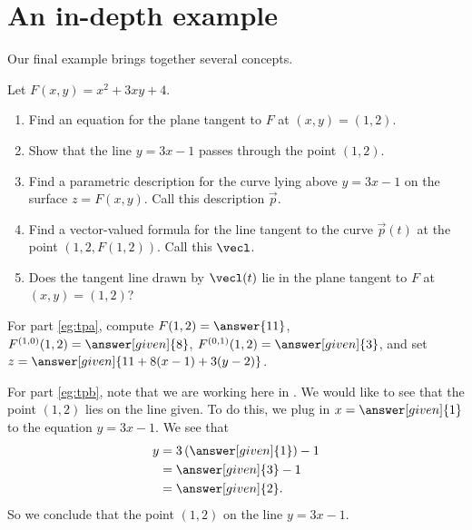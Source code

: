 \documentclass{ximera}
\begin{document}
\section{An in-depth example}

Our final example brings together several concepts.
\begin{example}
  Let $F(x,y) = x^2 + 3xy + 4$.
  \begin{enumerate}
  \item\label{eg:tpa} Find an equation for the plane tangent to $F$ at $(x,y) =
    (1,2)$.
  \item\label{eg:tpb} Show that the line $y = 3x - 1$ passes through the point $(1,2)$.
  \item\label{eg:tpc} Find a parametric description for the curve
    lying above $y = 3x-1$ on the surface $z = F(x,y)$. Call this
    description $\vec{p}$.
  \item\label{eg:tpd} Find a vector-valued formula for the line tangent to the curve
    $\vec{p}(t)$ at the point $(1, 2, F(1,2))$. Call this $\vecl$.
  \item\label{eg:tpe} Does the tangent line drawn by $\vecl(t)$ lie in the plane
    tangent to $F$ at $(x,y)=(1,2)$?
  \end{enumerate}
  \begin{explanation}
    For part \ref{eg:tpa}, compute $F(1,2) = \answer{11}$,
    $F^{(1,0)}(1,2) = \answer[given]{8}$, $F^{(0,1)}(1,2) =
    \answer[given]{3}$, and set $z = \answer[given]{11 + 8(x-1) +
      3(y-2)}$.

    For part \ref{eg:tpb}, note that we are working here in
    .  We would like to see that the point
    $(1,2)$ lies on the line given.  To do this, we plug in $x =
    \answer[given]{1}$ to the equation $y = 3x - 1$.  We see that
          \begin{align*}
            y &= 3\left(\answer[given]{1}\right) - 1 \\
            &= \answer[given]{3} - 1 \\
            &= \answer[given]{2}.
          \end{align*}
          So we conclude that the point $(1, 2)$
           on the
          line $y = 3x-1$.
 

\end{explanation}
\end{example}
\end{document}
